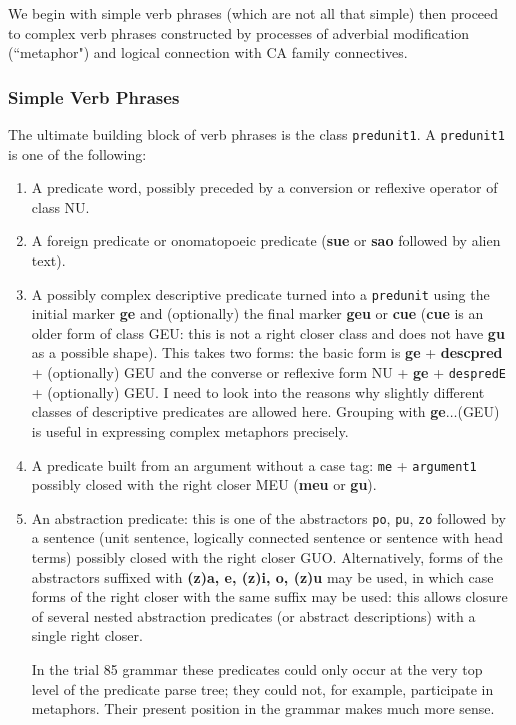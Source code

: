 \documentclass[12pt]{book}
\begin{document}
We begin with simple verb phrases (which are not all that simple) then proceed to complex verb phrases constructed by processes of
adverbial modification (``metaphor") and logical connection with CA family connectives.

\subsubsection{Simple Verb Phrases}

The ultimate building block of verb phrases is the class {\tt predunit1}.  A {\tt predunit1} is one of the following:

\begin{enumerate}

\item  A predicate word, possibly preceded by a conversion or reflexive operator of class NU.

\item  A foreign predicate or onomatopoeic predicate ({\bf sue} or {\bf sao} followed by alien text).

\item A possibly complex descriptive predicate turned into a {\tt predunit} using the initial marker {\bf ge} and (optionally) the final marker {\bf geu} or {\bf cue} ({\bf cue} is an older form of class GEU:  this is not a right closer class and does not have {\bf gu} as a possible shape).  This takes two forms:  the basic form is {\bf ge} + {\bf descpred} + (optionally) GEU and
the converse or reflexive form NU + {\bf ge} + {\tt despredE} + (optionally) GEU.  I need to look into the reasons why slightly different classes
of descriptive predicates are allowed here.  Grouping with {\bf ge}$\ldots$(GEU) is useful in expressing complex metaphors precisely.

\item A predicate built from an argument without a case tag:  {\tt me} + {\tt argument1} possibly closed with the right closer MEU ({\bf meu} or {\bf gu}).

\item An abstraction predicate:  this is one of the abstractors {\tt po}, {\tt pu}, {\tt zo} followed by a sentence (unit sentence, logically connected sentence or sentence with head terms) possibly closed with the right closer GUO.  Alternatively, forms of the abstractors suffixed with 
{\bf (z)a, e, (z)i, o, (z)u} may be used, in which case forms of the right closer with the same suffix may be used:  this allows closure of several nested abstraction predicates (or abstract descriptions) with a single right closer.

In the trial 85 grammar these predicates could only occur at the very top level of the predicate parse tree;  they could not, for example, participate in metaphors.   Their present position in the grammar makes much more sense.

\end{enumerate}
\end{document}
